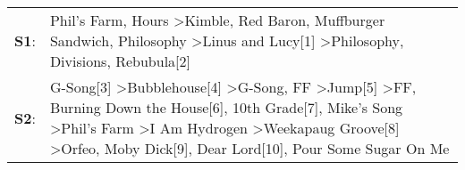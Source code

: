 \begin{supertabular}{p{0.03\textwidth}p{0.92\textwidth}}
 \textbf{S1}:  &                                                                                                                                                                                                                                                                                                                        Phil's Farm\textsuperscript{}, \enspace Hours\textsuperscript{} \textgreater \enspace Kimble\textsuperscript{}, \enspace Red Baron\textsuperscript{}, \enspace Muffburger Sandwich\textsuperscript{}, \enspace Philosophy\textsuperscript{} \textgreater \enspace Linus and Lucy[1]\textsuperscript{} \textgreater \enspace Philosophy\textsuperscript{}, \enspace Divisions\textsuperscript{}, \enspace Rebubula[2]\textsuperscript{}  \enspace  \\
 \textbf{S2}:  &  G-Song[3]\textsuperscript{} \textgreater \enspace Bubblehouse[4]\textsuperscript{} \textgreater \enspace G-Song\textsuperscript{}, \enspace FF\textsuperscript{} \textgreater \enspace Jump[5]\textsuperscript{} \textgreater \enspace FF\textsuperscript{}, \enspace Burning Down the House[6]\textsuperscript{}, \enspace 10th Grade[7]\textsuperscript{}, \enspace Mike's Song\textsuperscript{} \textgreater \enspace Phil's Farm\textsuperscript{} \textgreater \enspace I Am Hydrogen\textsuperscript{} \textgreater \enspace Weekapaug Groove[8]\textsuperscript{} \textgreater \enspace Orfeo\textsuperscript{}, \enspace Moby Dick[9]\textsuperscript{}, \enspace Dear Lord[10]\textsuperscript{}, \enspace Pour Some Sugar On Me\textsuperscript{}  \enspace  \\
\end{supertabular}
